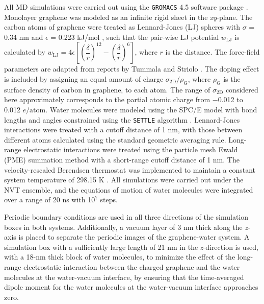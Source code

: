 All MD simulations were carried out
using the \texttt{GROMACS} 4.5 software package
\cite{Hess_2008_gromacs}. Monolayer graphene was modeled as an
infinite rigid sheet in the \textit{xy}-plane.
%
The carbon atoms of graphene were treated as Lennard-Jones (LJ)
spheres with \(\sigma\) = 0.34 nm and \(\epsilon\) = 0.223 kJ/mol
\cite{Cheng_1990}, such that the pair-wise LJ potential
$w_{\mathrm{LJ}}$ is calculated by
\(w_{\mathrm{LJ}} = 4
\epsilon\left[\left(\dfrac{\delta}{r}\right)^{12} -
  \left(\dfrac{\delta}{r}\right)^{6}\right]\), where $r$ is the
distance.  The force-field parameters are adapted from reports by
Tummala and Striolo \cite{Tummala_2008_counterion_SDS}.
%
The doping effect is included by assigning an equal amount of charge
\(\sigma_{\mathrm{2D}} / \rho_{\mathrm{G}}\), where
\(\rho_{\mathrm{G}}\) is the surface density of carbon in graphene, to
each atom.
%
The range of \(\sigma_{\mathrm{2D}}\) considered here
approximately corresponds to the partial atomic charge from −0.012 to
0.012 \(e/\mathrm{atom}\).
%
Water molecules were modeled using the SPC/E model
\cite{Berendsen_1987_pair} with bond lengths and angles constrained
using the \texttt{SETTLE} algorithm
\cite{Miyamoto_1992_SHAKE_RATTLE}. Lennard-Jones interactions were
treated with a cutoff distance of 1 nm, with those between different
atoms calculated using the standard geometric averaging
rule. Long-range electrostatic interactions were treated using the
particle mesh Ewald (PME) summation method
\cite{Darden_1993_ewald,Essmann_1995_ewald} with a short-range cutoff
distance of 1 nm. The velocity-rescaled Berendsen thermostat was
implemented to maintain a constant system temperature of 298.15 K
\cite{Bussi_2007}. All simulations were carried out under the NVT
ensemble, and the equations of motion of water molecules were
integrated over a range of 20 ns with 10\(^{\text{7}}\) steps.

Periodic boundary conditions are used in all three directions of the
simulation boxes in both systems. Additionally, a vacuum layer of 3 nm
thick along the \emph{z}-axis is placed to separate the periodic
images of the graphene-water system. A simulation box with a
sufficiently large length of 21 nm in the \emph{z}-direction is used,
with a 18-nm thick block of water molecules, to minimize the effect of
the long-range electrostatic interaction between the charged graphene
and the water molecules at the water-vacuum interface, by ensuring
that the time-averaged dipole moment for the water molecules at the
water-vacuum interface approaches zero.




